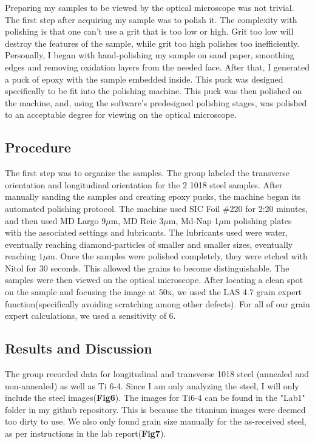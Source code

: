 \documentclass{article}
\begin{document}
Preparing my samples to be viewed by the optical microscope was not trivial. The first step after acquiring my sample was to polish it. The complexity with polishing is that one can't use a grit that is too low or high. Grit too low will destroy the features of the sample, while grit too high polishes too inefficiently. Personally, I began with hand-polishing my sample on sand paper, smoothing edges and removing oxidation layers from the needed face. After that, I generated a puck of epoxy with the sample embedded inside. This puck was designed specifically to be fit into the polishing machine. This puck was then polished on the machine, and, using the software's predesigned polishing stages, was polished to an acceptable degree for viewing on the optical microscope.

\subsection{Procedure}

The first step was to organize the samples. The group labeled the transverse orientation and longitudinal orientation for the 2 1018 steel samples. After manually sanding the samples and creating epoxy pucks, the machine began its automated polishing protocol. The machine used SIC Foil \#220 for 2:20 minutes, and then used MD Largo 9$\mu$m, MD Reic 3$\mu$m, Md-Nap 1$\mu$m polishing plates with the associated settings and lubricants. The lubricants used were water, eventually reaching diamond-particles of smaller and smaller sizes, eventually reaching $1\mu$m. Once the samples were polished completely, they were etched with Nitol for 30 seconds. This allowed the grains to become distinguishable. The samples were then viewed on the optical microscope. After locating a clean spot on the sample and focusing the image at 50x, we used the LAS 4.7 grain expert function(specifically avoiding scratching among other defects). For all of our grain expert calculations, we used a sensitivity of 6.

\subsection{Results and Discussion}

The group recorded data for longitudinal and transverse 1018 steel (annealed and non-annealed) as well as Ti 6-4. Since I am only analyzing the steel, I will only include the steel images(\textbf{Fig6}). The images for Ti6-4 can be found in the "Lab1" folder in my github repository. This is because the titanium images were deemed too dirty to use. We also only found grain size manually for the as-received steel, as per instructions in the lab report(\textbf{Fig7}).
\end{document}

